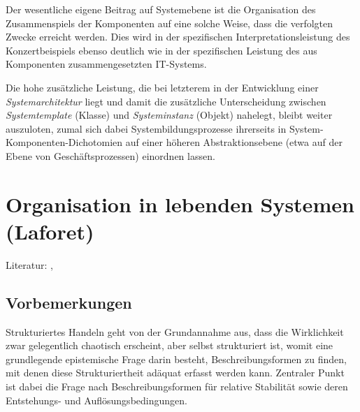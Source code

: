 \documentclass[11pt,a4paper]{article}
\begin{document}
Der wesentliche eigene Beitrag auf Systemebene ist die Organisation des
Zusammenspiels der Komponenten auf eine solche Weise, dass die verfolgten
Zwecke erreicht werden. Dies wird in der spezifischen Interpretationsleistung
des Konzertbeispiels ebenso deutlich wie in der spezifischen Leistung des aus
Komponenten zusammengesetzten IT-Systems.

Die hohe zusätzliche Leistung, die bei letzterem in der Entwicklung einer
\emph{Systemarchitektur} liegt und damit die zusätzliche Unterscheidung
zwischen \emph{Systemtemplate} (Klasse) und \emph{Systeminstanz} (Objekt)
nahelegt, bleibt weiter auszuloten, zumal sich dabei Systembildungsprozesse
ihrerseits in System-Komponenten-Dichotomien auf einer höheren
Abstraktionsebene (etwa auf der Ebene von Geschäftsprozessen) einordnen
lassen.

\section{Organisation in lebenden Systemen (Laforet)}

Literatur: \cite{Mingers1989}, \cite{Ulanowicz2009}

\subsection{Vorbemerkungen}

Strukturiertes Handeln geht von der Grundannahme aus, dass die Wirklichkeit
zwar gelegentlich chaotisch erscheint, aber selbst strukturiert ist, womit
eine grundlegende epistemische Frage darin besteht, Beschreibungsformen zu
finden, mit denen diese Strukturiertheit adäquat erfasst werden kann.
Zentraler Punkt ist dabei die Frage nach Beschreibungsformen für relative
Stabilität sowie deren Entstehungs- und Auflösungsbedingungen.
\end{document}
